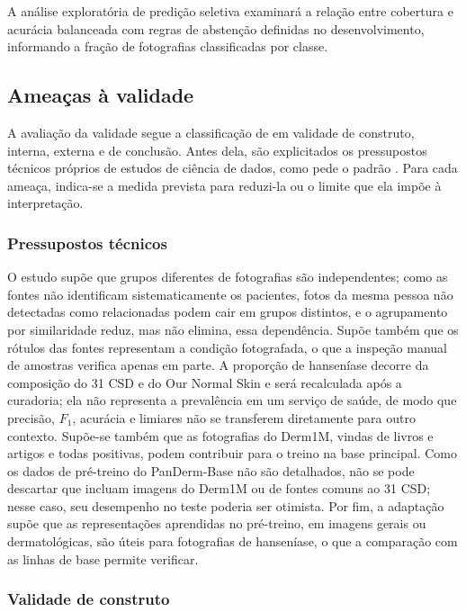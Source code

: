 A análise exploratória de predição seletiva examinará a relação entre
cobertura e acurácia balanceada com regras de abstenção definidas no
desenvolvimento, informando a fração de fotografias classificadas por
classe.

\subsection{Ameaças à validade}
\label{sec:validade-avaliacao-empirica}

A avaliação da validade segue a classificação de 
em validade de construto, interna, externa e de conclusão. Antes dela, são
explicitados os pressupostos técnicos próprios de estudos de ciência de
dados, como pede o padrão \cite{acmSigsoftDataScience}. Para cada ameaça,
indica-se a medida prevista para reduzi-la ou o limite que ela impõe à
interpretação.

\subsubsection*{Pressupostos técnicos}
\label{subsec:pressupostos-tecnicos}

O estudo supõe que grupos diferentes de fotografias são independentes; como
as fontes não identificam sistematicamente os pacientes, fotos da mesma pessoa não detectadas
como relacionadas podem cair em grupos distintos, e o agrupamento por
similaridade reduz, mas não elimina, essa dependência. Supõe também que os
rótulos das fontes representam a condição fotografada, o que a inspeção
manual de amostras verifica apenas em parte. A proporção de hanseníase
decorre da composição do 31 CSD e do Our Normal Skin e será recalculada após a curadoria; ela não representa a prevalência em um serviço de
saúde, de modo que precisão, $F_1$, acurácia e
limiares não se transferem diretamente para outro contexto. Supõe-se
também que as fotografias do Derm1M, vindas de livros e artigos e todas
positivas, podem contribuir para o treino na base principal. Como os
dados de pré-treino do PanDerm-Base não são detalhados, não se pode
descartar que incluam imagens do Derm1M ou de fontes comuns ao 31 CSD;
nesse caso, seu desempenho no teste poderia ser otimista. Por fim, a adaptação supõe que as representações aprendidas no
pré-treino, em imagens gerais ou dermatológicas, são úteis para fotografias
de hanseníase, o que a comparação com as linhas de base permite verificar.

\subsubsection*{Validade de construto}


